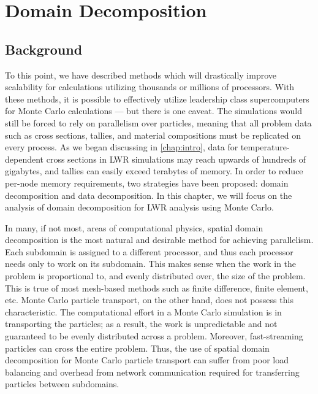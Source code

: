 \chapter{Domain Decomposition}
\label{chap:domain-decomp}

\newcommand{\lave}{\langle \lambda \rangle}
\newcommand{\lmave}{\langle \overline{\lambda} \rangle}
\newcommand{\dpmax}{\delta{p_i^{max}}}
\newcommand{\pmax}{{p_i^{max}}}
\newcommand{\lmax}{{\lambda_i^{max}}}
\newcommand{\pbar}{\overline{P}}
\newcommand{\lbar}{\overline{\lambda}}

\section{Background}

To this point, we have described methods which will drastically improve
scalability for calculations utilizing thousands or millions of processors. With
these methods, it is possible to effectively utilize leadership class
supercomputers for Monte Carlo calculations --- but there is one caveat. The
simulations would still be forced to rely on parallelism over particles, meaning
that all problem data such as cross sections, tallies, and material compositions
must be replicated on every process. As we began discussing in
\autoref{chap:intro}, data for temperature-dependent cross sections in LWR
simulations may reach upwards of hundreds of gigabytes, and tallies can easily
exceed terabytes of memory. In order to reduce per-node memory requirements, two
strategies have been proposed: domain decomposition and data decomposition. In
this chapter, we will focus on the analysis of domain decomposition for LWR
analysis using Monte Carlo.

In many, if not most, areas of computational physics, spatial domain
decomposition is the most natural and desirable method for achieving
parallelism. Each subdomain is assigned to a different processor, and thus each
processor needs only to work on its subdomain. This makes sense when the work in
the problem is proportional to, and evenly distributed over, the size of the
problem. This is true of most mesh-based methods such as finite difference,
finite element, etc. Monte Carlo particle transport, on the other hand, does not
possess this characteristic. The computational effort in a Monte Carlo
simulation is in transporting the particles; as a result, the work is
unpredictable and not guaranteed to be evenly distributed across a
problem. Moreover, fast-streaming particles can cross the entire problem. Thus,
the use of spatial domain decomposition for Monte Carlo particle transport can
suffer from poor load balancing and overhead from network communication required
for transferring particles between subdomains.

